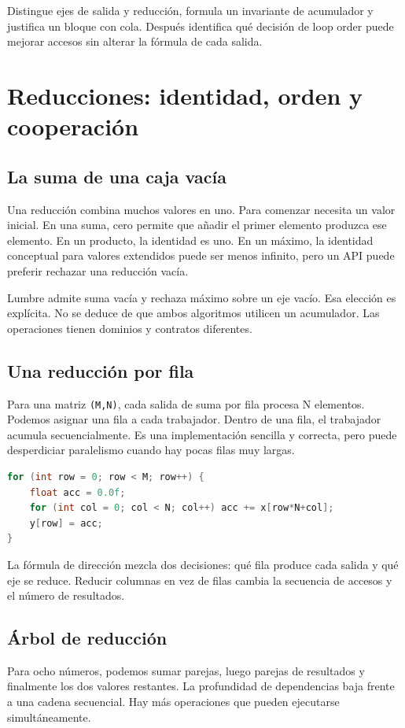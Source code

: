 \documentclass[12pt,a4paper,oneside]{report}
\begin{document}
\begin{comprueba}
Distingue ejes de salida y reducción, formula un invariante de acumulador y justifica un bloque con cola. Después identifica qué decisión de loop order puede mejorar accesos sin alterar la fórmula de cada salida.

\end{comprueba}
\chapter{Reducciones: identidad, orden y cooperación}
\label{ch:reducciones}
\section{La suma de una caja vacía}
Una reducción combina muchos valores en uno. Para comenzar necesita un valor inicial. En una suma, cero permite que añadir el primer elemento produzca ese elemento. En un producto, la identidad es uno. En un máximo, la identidad conceptual para valores extendidos puede ser menos infinito, pero un API puede preferir rechazar una reducción vacía.

Lumbre admite suma vacía y rechaza máximo sobre un eje vacío. Esa elección es explícita. No se deduce de que ambos algoritmos utilicen un acumulador. Las operaciones tienen dominios y contratos diferentes.

\section{Una reducción por fila}
Para una matriz \texttt{(M,N)}, cada salida de suma por fila procesa N elementos. Podemos asignar una fila a cada trabajador. Dentro de una fila, el trabajador acumula secuencialmente. Es una implementación sencilla y correcta, pero puede desperdiciar paralelismo cuando hay pocas filas muy largas.

\begin{lstlisting}[language=C]
for (int row = 0; row < M; row++) {
    float acc = 0.0f;
    for (int col = 0; col < N; col++) acc += x[row*N+col];
    y[row] = acc;
}
\end{lstlisting}
La fórmula de dirección mezcla dos decisiones: qué fila produce cada salida y qué eje se reduce. Reducir columnas en vez de filas cambia la secuencia de accesos y el número de resultados.

\section{Árbol de reducción}
Para ocho números, podemos sumar parejas, luego parejas de resultados y finalmente los dos valores restantes. La profundidad de dependencias baja frente a una cadena secuencial. Hay más operaciones que pueden ejecutarse simultáneamente.
\end{document}
